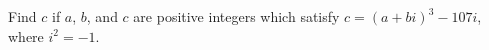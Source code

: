 Find $c$ if $a$, $b$, and $c$ are positive integers which satisfy $c=(a + bi)^3 - 107i$, where $i^2 = -1$.